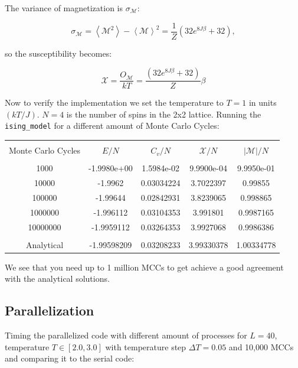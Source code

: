 \documentclass[a4paper, fontsize=11pt]{article}
\begin{document}
The variance of magnetization is $\sigma_{\mathcal{M}}$:

\begin{equation}
\sigma_{\mathcal{M}} = \left<\mathcal{M}^2 \right> - \left<\mathcal{M} \right>^2 = \frac{1}{Z} \left(32e^{8J \beta}  + 32\right),
\end{equation}

so the susceptibility becomes:


\begin{equation}
\mathcal{X} = \frac{O_{\mathcal{M}}}{kT} = \frac{\left(32e^{8J \beta}  + 32\right)}{Z}\beta
\end{equation}

Now to verify the implementation we set the temperature to $T = 1$ in units $(kT/J)$. $N = 4$ is the number of spins in the 2x2 lattice. Running the \verb+ising_model+ for a different amount of Monte Carlo Cycles:

\begin{center}
\begin{tabular}{ccccc}
\hline \\
Monte Carlo Cycles	& $E/N$  & $C_v/N$ & $\mathcal{X}/N$ & $|\mathcal{M}|/N$ \\
\hline \\
1000 	& -1.9980e+00  & 1.5984e-02  & 9.9900e-04  & 9.9950e-01 \\
10000  	& -1.9962      & 0.03034224  & 3.7022397   & 0.99855 \\
100000  & -1.99644     & 0.02842931  & 3.8239065   & 0.998865 \\
1000000 & -1.996112    & 0.03104353  & 3.991801    & 0.9987165 \\
10000000  & -1.9959112 & 0.03264353  & 3.9927068   & 0.9986386 \\
\hline \\
Analytical & -1.99598209 & 0.03208233  &3.99330378  &1.00334778 \\
\hline
\end{tabular}
\end{center}

We see that you need up to 1 million MCCs to get achieve a good agreement with the analytical solutions.

\subsection{Parallelization}
Timing the parallelized code with different amount of processes for $L = 40$, temperature $T \in [2.0, 3.0]$ with temperature step $\Delta T = 0.05$ and 10,000 MCCs and comparing it to the serial code:
\end{document}

